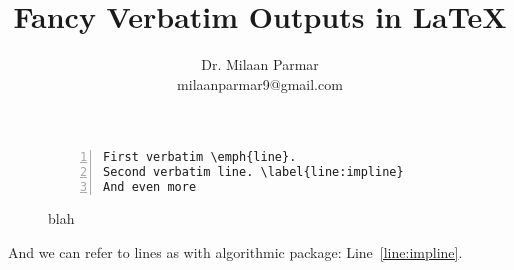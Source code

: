 \documentclass{article}
\begin{document}
\title{Fancy Verbatim Outputs in \LaTeX}
\author{Dr. Milaan Parmar \\ milaanparmar9@gmail.com}
\maketitle

\begin{figure*}
\begin{Verbatim}[frame=single,label=Sample Label,numbers=left,commandchars=\\\{\}]
First verbatim \emph{line}. 
Second verbatim line. \label{line:impline}
And even more
\end{Verbatim}
\caption{blah}
\end{figure*}

And we can refer to lines as with algorithmic package: Line~\ref{line:impline}.
\end{document}
